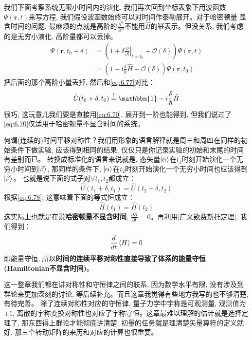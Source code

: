 我们下面考察系统无限小时间内的演化, 我们再次回到坐标表象下用波函数$\Psi(\mathbf{r},t)$来写方程, 我们假设波函数始终可以对时间作泰勒展开。对于哈密顿量
显含时间的问题, 最麻烦的点就是高阶的$\frac{\partial^n}{\partial t^n}$不能用$\hat{H}$的幂表示。但没关系, 我们考虑的是无穷小演化, 高阶量都可以丢掉。
\begin{align*}
    \Psi(\mathbf{r},t_0+\delta)&=\left(1+\delta\left.\frac{\partial }{\partial t}\right|_{t=t_0}+\mathcal{O}(\delta)\right)\Psi(\mathbf{r},t)\\
    &=\left(1-\mathrm{i}\frac{\delta}{\hbar}\hat{H}+\mathcal{O}(\delta)\right)\Psi(\mathbf{r},t_0)
\end{align*}
把后面的那个高阶小量丢掉, 然后和\ref{eq:6.77}对比：
\begin{equation}
    \label{eq:6.78}
    \hat{U}(t_0+\delta,t_0)\overset{!}{=}\mathbbm{1}-i\frac{\delta}{\hbar}\hat{H}
\end{equation}
很巧, 这玩意儿我们要是直接用\ref{eq:6.70}, 展开到一阶也能得到, 但我们说过了\ref{eq:6.70}仅适用于哈密顿量不显含时间的系统。

何谓(连续的)时间平移对称性？我们用形象的语言解释就是周三和周四在同样的初始条件下做实验, 应该得到相同的结果, 仅仅只是你记录实验的初始和末尾的时间有差别而已。
转换成标准化的语言来说就是, 态矢量$\ket{\alpha}$在$t_1$时刻开始演化一个无穷小时间到$\ket{\beta}$, 那同样的条件下, $\ket{\alpha}$在$t_2$时刻开始演化一个无穷小时间也应该得到$\ket{\beta}$。
也就是说下面的式子对$\forall t_1,t_2$都成立：
\[\hat U(t_1+\delta,t_1)=\hat{U}(t_2+\delta,t_2)\]
根据\ref{eq:6.78}, 这意味着下面的等式恒成立：
\[\hat{H}(t_1)=\hat{H}(t_2)\]
这实际上也就是在说\textbf{哈密顿量不显含时间}, $\frac{\partial \hat{H}}{\partial t}=0$。再利用\ref{广义欸费斯托定理}, 我们得到：
\[\frac{d}{dt}\braket{H}=0\]
即能量守恒, 所以\textbf{时间的连续平移对称性直接导致了体系的能量守恒(Hamiltonian不显含时间)}。

这一整章我们都在讲对称性和守恒律之间的联系, 因为数学水平有限, 没有涉及到群论来更加深刻的讨论, 等后续补充。而且这章我觉得有些地方我写的也不够清楚, 有待完善。
除了连续对称性对应的守恒律, 量子力学中宇称是可观测量, 观测值为$\pm 1$, 离散的宇称变换对称性也对应了宇称守恒。这章最难以理解的估计就是选择定理了, 那东西得上群论才能彻底讲清楚,
初量的任务就是理清楚矢量算符的定义就好, 那三个转动矩阵的来历和对应的计算也很重要。

